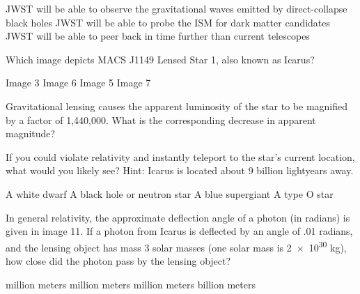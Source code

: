 \documentclass{exam}
\begin{document}
\begin{multicols*}{2}
\begin{questions}
\begin{choices}
	\choice JWST will be able to observe the gravitational waves emitted by direct-collapse black holes
	\choice JWST will be able to probe the ISM for dark matter candidates
	\CorrectChoice JWST will be able to peer back in time further than current telescopes
	\end{choices}
\end{questions}
\hrulefill
\begin{questions}
\setcounter{question}{36}
\question Which image depicts MACS J1149 Lensed Star 1, also known as Icarus?
	\begin{choices}
	\choice Image 3
	\choice Image 6
	\CorrectChoice Image 5
	\choice Image 7
	\end{choices}
\question Gravitational lensing causes the apparent luminosity of the star to be magnified by a factor of 1,440,000. What is the corresponding decrease in apparent magnitude?
	\begin{choices}
	\choice 2.4
	\CorrectChoice 15.4 
	\choice 21.5
	\choice 24.0
	\end{choices}
\question If you could violate relativity and instantly teleport to the star's current location, what would you likely see? Hint: Icarus is located about 9 billion lightyears away.
	\begin{choices}
	\choice A white dwarf
	\CorrectChoice A black hole or neutron star
	\choice A blue supergiant
	\choice A type O star
	\end{choices}
\question In general relativity, the approximate deflection angle of a photon (in radians) is given in image 11. If a photon from Icarus is deflected by an angle of .01 radians, and the lensing object has mass 3 solar masses (one solar mass is \num{2e30} kg), how close did the photon pass by the lensing object?
	\begin{choices}
	 million meters 
	 million meters
	 million meters
	 billion meters
	\end{choices}
\end{questions}
\end{multicols*}
\renewcommand{\choiceshook}{}
\renewcommand{\questionshook}{}
\raggedcolumns
\end{document}
